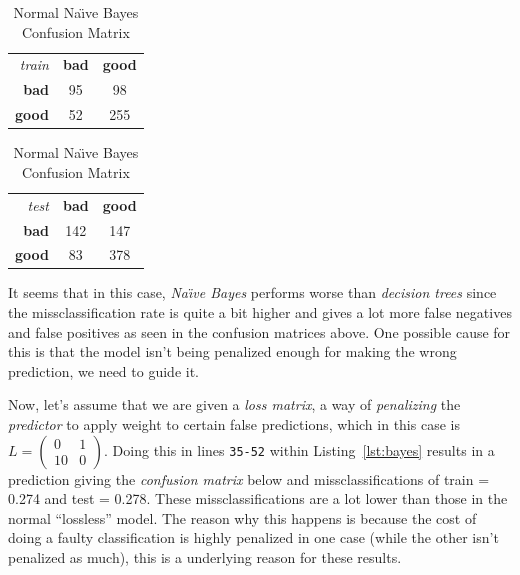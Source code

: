 \documentclass[a4paper, twocolumn]{article}
\begin{document}
        \begin{table}[h]
        \begin{center}
        \begin{tabular}{r|c|c|}
            \multicolumn{1}{r}{\emph{train}}
            &\multicolumn{1}{c}{\textbf{bad}}
            &\multicolumn{1}{c}{\textbf{good}} \\
            \cline{2-3}
            \textbf{bad} & 95 & 98 \\
            \cline{2-3}
            \textbf{good} & 52 & 255 \\
            \cline{2-3}
        \end{tabular}
        \begin{tabular}{r|c|c|}
            \multicolumn{1}{r}{\emph{test}}
            &\multicolumn{1}{c}{\textbf{bad}}
            &\multicolumn{1}{c}{\textbf{good}} \\
            \cline{2-3}
            \textbf{bad} & 142 & 147 \\
            \cline{2-3}
            \textbf{good} & 83 & 378 \\
            \cline{2-3}
        \end{tabular}
        \end{center}
        \caption{Normal Na{\"\i}ve Bayes Confusion Matrix}
        \label{table:bayes}
        \end{table}

        It seems that in this case, \emph{Na{\"\i}ve Bayes} performs worse than \emph{decision trees} since the missclassification rate is quite a bit higher and gives a lot more false negatives and false positives as seen in the confusion matrices above. One possible cause for this is that the model isn't being penalized enough for making the wrong prediction, we need to guide it.

        Now, let's assume that we are given a \emph{loss matrix}, a way of \emph{penalizing} the \emph{predictor} to apply weight to certain false predictions, which in this case is $L = \left( \begin{smallmatrix}0&1\\10&0\end{smallmatrix} \right)$. Doing this in lines \texttt{35-52} within Listing~\ref{lst:bayes} results in a prediction giving the \emph{confusion matrix} below and missclassifications of train = 0.274 and test = 0.278. These missclassifications are a lot lower than those in the normal ``lossless'' model. The reason why this happens is because the cost of doing a faulty classification is highly penalized in one case (while the other isn't penalized as much), this is a underlying reason for these results.
\end{document}
